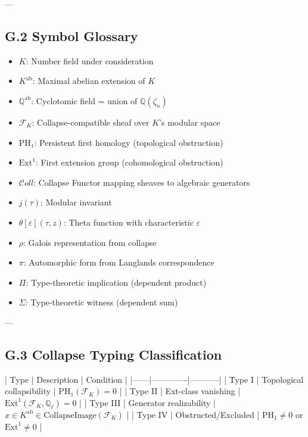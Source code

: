 \documentclass[11pt]{article}
\begin{document}
---

\subsection*{G.2 Symbol Glossary}

\begin{itemize}
    \item \( K \): Number field under consideration
    \item \( K^{\mathrm{ab}} \): Maximal abelian extension of \( K \)
    \item \( \mathbb{Q}^{\mathrm{ab}} \): Cyclotomic field = union of \( \mathbb{Q}(\zeta_n) \)
    \item \( \mathcal{F}_K \): Collapse-compatible sheaf over \( K \)'s modular space
    \item \( \mathrm{PH}_1 \): Persistent first homology (topological obstruction)
    \item \( \mathrm{Ext}^1 \): First extension group (cohomological obstruction)
    \item \( \mathcal{C}oll \): Collapse Functor mapping sheaves to algebraic generators
    \item \( j(\tau) \): Modular invariant
    \item \( \theta[\varepsilon](\tau, z) \): Theta function with characteristic \( \varepsilon \)
    \item \( \rho \): Galois representation from collapse
    \item \( \pi \): Automorphic form from Langlands correspondence
    \item \( \Pi \): Type-theoretic implication (dependent product)
    \item \( \Sigma \): Type-theoretic witness (dependent sum)
\end{itemize}

---

\subsection*{G.3 Collapse Typing Classification}

| Type | Description | Condition |
|------|-------------|-----------|
| Type I | Topological collapsibility | \( \mathrm{PH}_1(\mathcal{F}_K) = 0 \) |
| Type II | Ext-class vanishing | \( \mathrm{Ext}^1(\mathcal{F}_K, \mathbb{Q}_\ell) = 0 \) |
| Type III | Generator realizability | \( x \in K^{\mathrm{ab}} \in \text{CollapseImage}(\mathcal{F}_K) \) |
| Type IV | Obstructed/Excluded | \( \mathrm{PH}_1 \ne 0 \) or \( \mathrm{Ext}^1 \ne 0 \) |
\end{document}
